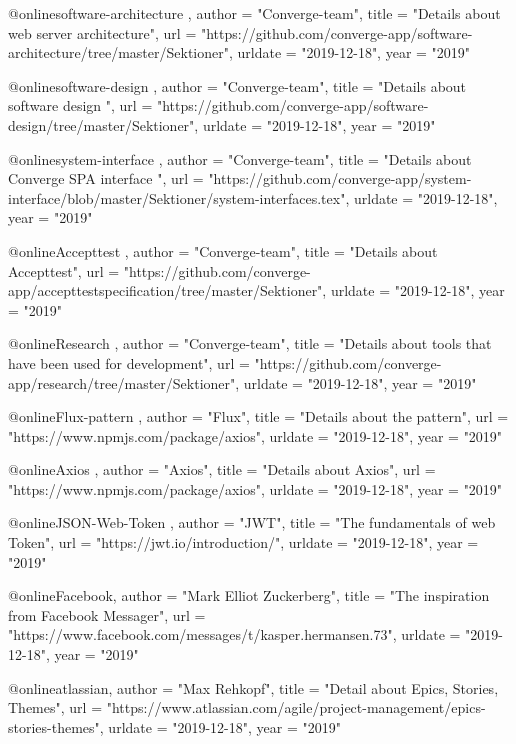 @online{software-architecture ,
    author = "Converge-team",
    title = "{Details about web server architecture}",
    url = "https://github.com/converge-app/software-architecture/tree/master/Sektioner",
    urldate = "2019-12-18",
    year = "2019"
}

@online{software-design ,
    author = "Converge-team",
    title = "{Details about software design }",
    url = "https://github.com/converge-app/software-design/tree/master/Sektioner",
    urldate = "2019-12-18",
    year = "2019"
}

@online{system-interface ,
    author = "Converge-team",
    title = "{Details about Converge SPA interface }",
    url = "https://github.com/converge-app/system-interface/blob/master/Sektioner/system-interfaces.tex",
    urldate = "2019-12-18",
    year = "2019"
}

@online{Accepttest ,
    author = "Converge-team",
    title = "{Details about Accepttest}",
    url = "https://github.com/converge-app/accepttestspecification/tree/master/Sektioner",
    urldate = "2019-12-18",
    year = "2019"
}

@online{Research ,
    author = "Converge-team",
    title = "{Details about tools that have been used for development}",
    url = "https://github.com/converge-app/research/tree/master/Sektioner",
    urldate = "2019-12-18",
    year = "2019"
}

@online{Flux-pattern ,
    author = "Flux",
    title = "{Details about the pattern}",
    url = "https://www.npmjs.com/package/axios",
    urldate = "2019-12-18",
    year = "2019"
}

@online{Axios ,
    author = "Axios",
    title = "{Details about Axios}",
    url = "https://www.npmjs.com/package/axios",
    urldate = "2019-12-18",
    year = "2019"
}

@online{JSON-Web-Token ,
    author = "JWT",
    title = "{The fundamentals of web Token}",
    url = "https://jwt.io/introduction/",
    urldate = "2019-12-18",
    year = "2019"
}

@online{Facebook,
    author = "Mark Elliot Zuckerberg",
    title = "{The inspiration from Facebook Messager}",
    url = "https://www.facebook.com/messages/t/kasper.hermansen.73",
    urldate = "2019-12-18",
    year = "2019"
}

@online{atlassian,
    author = "Max Rehkopf",
    title = "{Detail about Epics, Stories, Themes}",
    url = "https://www.atlassian.com/agile/project-management/epics-stories-themes",
    urldate = "2019-12-18",
    year = "2019"
}

